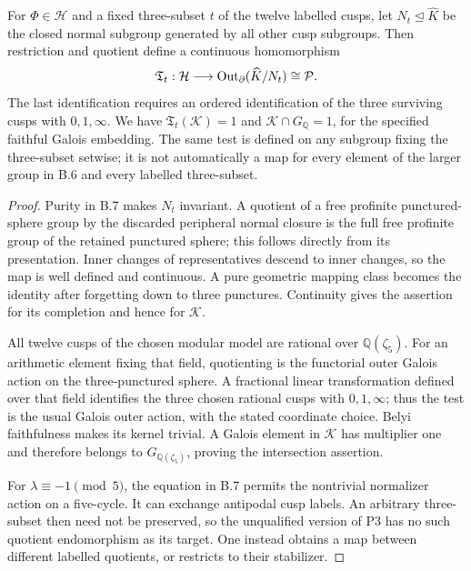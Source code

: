 For \(\Phi\in\mathcal H\) and a fixed three-subset \(t\) of the
twelve labelled cusps, let \(N_t\trianglelefteq\widehat K\) be
the closed normal subgroup generated by all other cusp subgroups.
Then restriction and quotient define a continuous homomorphism
\[
 \mathfrak T_t:\mathcal H\longrightarrow
 \operatorname{Out}_{\partial}(\widehat K/N_t)\cong\mathcal P.
\]
The last identification requires an ordered identification of the
three surviving cusps with \(0,1,\infty\). We have
\(\mathfrak T_t(\mathcal K)=1\) and
\(\mathcal K\cap G_{\mathbb Q}=1\), for the specified faithful
Galois embedding. The same test is defined on any subgroup fixing
the three-subset setwise; it is not automatically a map for every
element of the larger group in B.6 and every labelled three-subset.
\begin{proof}
Purity in B.7 makes \(N_t\) invariant. A quotient of a free
profinite punctured-sphere group by the discarded peripheral normal
closure is the full free profinite group of the retained punctured
sphere; this follows directly from its presentation. Inner changes
of representatives descend to inner changes, so the map is well
defined and continuous. A pure geometric mapping class becomes the
identity after forgetting down to three punctures. Continuity gives
the assertion for its completion and hence for \(\mathcal K\).

All twelve cusps of the chosen modular model are rational over
\(\mathbb Q(\zeta_5)\). For an arithmetic element fixing that
field, quotienting is the functorial outer Galois action on the
three-punctured sphere. A fractional linear transformation defined
over that field identifies the three chosen rational cusps with
\(0,1,\infty\); thus the test is the usual Galois outer action,
with the stated coordinate choice. Belyi faithfulness makes its
kernel trivial. A Galois element in \(\mathcal K\) has multiplier
one and therefore belongs to \(G_{\mathbb Q(\zeta_5)}\), proving
the intersection assertion.

For \(\lambda\equiv-1\pmod5\), the equation in B.7 permits the
nontrivial normalizer action on a five-cycle. It can exchange
antipodal cusp labels. An arbitrary three-subset then need not be
preserved, so the unqualified version of P3 has no such quotient
endomorphism as its target. One instead obtains a map between
different labelled quotients, or restricts to their stabilizer.
\end{proof}

